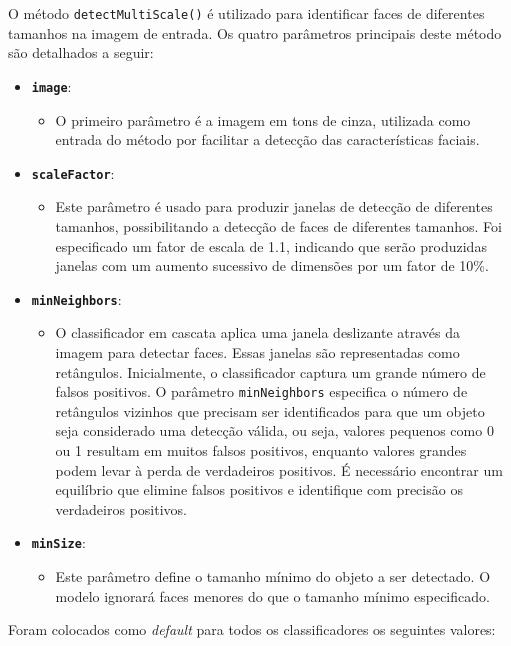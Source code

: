 O método \texttt{detectMultiScale()} é utilizado para identificar faces de diferentes tamanhos na imagem de entrada. Os quatro parâmetros principais deste método são detalhados a seguir:
\begin{itemize}
    \item \textbf{\texttt{image}}:
    \begin{itemize}
        \item O primeiro parâmetro é a imagem em tons de cinza, utilizada como entrada do método por facilitar a detecção das características faciais.
    \end{itemize}
    \item \textbf{\texttt{scaleFactor}}:
    \begin{itemize}
        \item Este parâmetro é usado para produzir janelas de detecção de diferentes tamanhos, possibilitando a detecção de faces de diferentes tamanhos. Foi especificado um fator de escala de 1.1, indicando que serão produzidas janelas com um aumento sucessivo de dimensões por um fator de 10\%.
    \end{itemize}
    \item \textbf{\texttt{minNeighbors}}:
    \begin{itemize}
        \item O classificador em cascata aplica uma janela deslizante através da imagem para detectar faces. Essas janelas são representadas como retângulos. Inicialmente, o classificador captura um grande número de falsos positivos. O parâmetro \texttt{minNeighbors} especifica o número de retângulos vizinhos que precisam ser identificados para que um objeto seja considerado uma detecção válida, ou seja, valores pequenos como 0 ou 1 resultam em muitos falsos positivos, enquanto valores grandes podem levar à perda de verdadeiros positivos. É necessário encontrar um equilíbrio que elimine falsos positivos e identifique com precisão os verdadeiros positivos.
    \end{itemize}
    \item \textbf{\texttt{minSize}}:
    \begin{itemize}
        \item Este parâmetro define o tamanho mínimo do objeto a ser detectado. O modelo ignorará faces menores do que o tamanho mínimo especificado.
    \end{itemize}
\end{itemize}

Foram colocados como \textit{default} para todos os classificadores os seguintes valores: 

